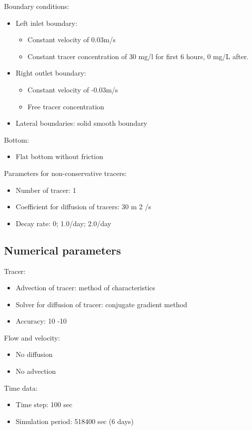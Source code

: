 Boundary conditions:
\begin{itemize}
\item Left inlet boundary:
\begin{itemize}
\item Constant velocity of 0.03m/s
\item Constant tracer concentration of 30 mg/l for first 6 hours, 0 mg/L after.
\end{itemize}
\item Right outlet boundary:
\begin{itemize}
\item Constant velocity of -0.03m/s
\item Free tracer concentration
\end{itemize}
\item Lateral boundaries: solid smooth boundary
\end{itemize}

Bottom:
\begin{itemize}
\item Flat bottom without friction
\end{itemize}

Parameters for non-conservative tracers:
\begin{itemize}
\item Number of tracer: 1
\item Coefficient for diffusion of tracers: 30 m 2 /s
\item Decay rate: 0; 1.0/day; 2.0/day
\end{itemize}

\subsection{Numerical parameters}

Tracer:
\begin{itemize}
\item Advection of tracer: method of characteristics
\item Solver for diffusion of tracer: conjugate gradient method
\item Accuracy: 10 -10
\end{itemize}

Flow and velocity:
\begin{itemize}
  \item No diffusion
  \item No advection
\end{itemize}

Time data:
\begin{itemize}
  \item Time step: 100 sec
  \item Simulation period: 518400 sec (6 days)
\end{itemize}

